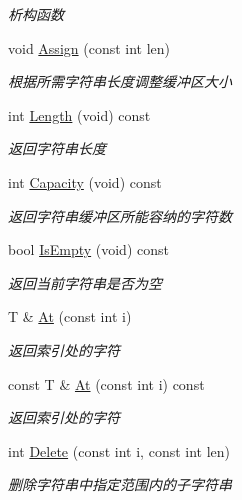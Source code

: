 \begin{DoxyCompactItemize}
\begin{DoxyCompactList}\small\item\em 析构函数 \end{DoxyCompactList}\item 
void \hyperlink{class_util_1_1_string_t_a5775703e044ee57083e8dbed36837ec2}{Assign} (const int len)
\begin{DoxyCompactList}\small\item\em 根据所需字符串长度调整缓冲区大小 \end{DoxyCompactList}\item 
int \hyperlink{class_util_1_1_string_t_ab8dd0984514e44046b30f66e1f63b2c1}{Length} (void) const 
\begin{DoxyCompactList}\small\item\em 返回字符串长度 \end{DoxyCompactList}\item 
int \hyperlink{class_util_1_1_string_t_a72e976002115574ec303af27375ed65f}{Capacity} (void) const 
\begin{DoxyCompactList}\small\item\em 返回字符串缓冲区所能容纳的字符数 \end{DoxyCompactList}\item 
bool \hyperlink{class_util_1_1_string_t_a216aedf3b116d9f2b402edfd2d4f41c5}{Is\-Empty} (void) const 
\begin{DoxyCompactList}\small\item\em 返回当前字符串是否为空 \end{DoxyCompactList}\item 
T \& \hyperlink{class_util_1_1_string_t_a89a211d1470fce86db51e798137488b9}{At} (const int i)
\begin{DoxyCompactList}\small\item\em 返回索引处的字符 \end{DoxyCompactList}\item 
const T \& \hyperlink{class_util_1_1_string_t_a9dbec7dd16a3f3b30ec1c893fce410b2}{At} (const int i) const 
\begin{DoxyCompactList}\small\item\em 返回索引处的字符 \end{DoxyCompactList}\item 
int \hyperlink{class_util_1_1_string_t_ae3904115e9111e8254fea22fbd522fbb}{Delete} (const int i, const int len)
\begin{DoxyCompactList}\small\item\em 删除字符串中指定范围内的子字符串 \end{DoxyCompactList}\item 

\end{DoxyCompactItemize}
